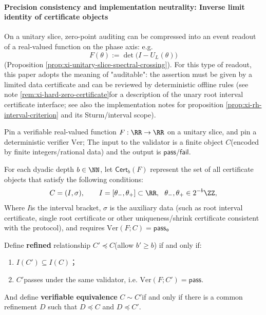 \paragraph{Precision consistency and implementation neutrality: Inverse limit identity of certificate objects}
On a unitary slice, zero-point auditing can be compressed into an event readout of a real-valued function on the phase axis: e.g.
\[
F(\theta):=\det\!\bigl(I-U_L(\theta)\bigr)
\]
(Proposition \ref{prop:xi-unitary-slice-spectral-crossing}).
For this type of readout, this paper adopts the meaning of "auditable": the assertion must be given by a limited data certificate and can be reviewed by deterministic offline rules (see note \ref{rem:xi-hard-zero-certificate} ​​for a description of the unary root interval certificate interface; see also the implementation notes for proposition \ref{prop:xi-rh-interval-criterion} and its Sturm/interval scope).

\begin{definition}\label{def:xi-cert-refinement-equivalence}
Pin a verifiable real-valued function \(F:\RR\to\RR\) ​​on a unitary slice, and pin a deterministic verifier \(\mathrm{Ver}\);
The input to the validator is a finite object \(C\) ​​(encoded by finite integers/rational data) and the output is \(\mathsf{pass}/\mathsf{fail}\).
\par
For each dyadic depth \(b\in\NN\), let \(\mathsf{Cert}_b(F)\) represent the set of all certificate objects that satisfy the following conditions:
\[
C=(I,\sigma),\qquad I=[\theta_{-},\theta_{+}]\subset\RR,\ \ \theta_{-},\theta_{+}\in 2^{-b}\ZZ,
\]
Where \(I\) ​​is the interval bracket, \(\sigma\) is the auxiliary data (such as root interval certificate, single root certificate or other uniqueness/shrink certificate consistent with the protocol), and requires
\(
\mathrm{Ver}(F;C)=\mathsf{pass}
\)。
\par
Define \textbf{refined} relationship \(C'\preceq C\) ​​(allow \(b'\ge b\)) if and only if:
\begin{enumerate}
  \item \(I(C')\subseteq I(C)\)；
  \item \(C'\) ​​passes under the same validator, i.e. \(\mathrm{Ver}(F;C')=\mathsf{pass}\).
\end{enumerate}
And define \textbf{verifiable equivalence} \(C\sim C'\) ​​if and only if there is a common refinement \(D\) such that \(D\preceq C\) and \(D\preceq C'\).
\end{definition}

